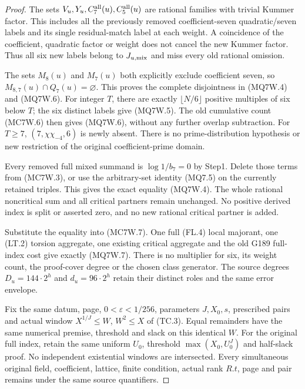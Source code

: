 \begin{proof}
The sets $V_u,Y_u,C_7^{\rm all}(u),C_5^{\rm all}(u)$ are
rational families with trivial Kummer factor. This includes
all the previously removed coefficient-seven quadratic/seven
labels and its single residual-match label at each weight.
A coincidence of the coefficient, quadratic factor or weight
does not cancel the new Kummer factor. Thus all six new labels
belong to $J_{u,\rm mix}$ and miss every old rational omission.

The sets $M_8(u)$ and $M_7(u)$ both explicitly exclude
coefficient seven, so $M_{8,7}(u)\cap Q_7(u)=\varnothing$.
This proves the complete disjointness in (MQ7W.4) and (MQ7W.6).
For integer $T$, there are exactly $\lfloor N/6\rfloor$
positive multiples of six below $T$; the six distinct labels
give (MQ7W.5). The old cumulative count (MC7W.6) then gives
(MQ7W.6), without any further overlap subtraction.
For $T\geq7$, $(7,\chi\chi_{-4},6)$ is newly absent.
There is no prime-distribution hypothesis or new restriction
of the original coefficient-prime domain.

Every removed full mixed summand is $\log1/b_7=0$ by Step1.
Delete those terms from (MC7W.3), or use the arbitrary-set
identity (MQ7.5) on the currently retained triples.
This gives the exact equality (MQ7W.4).
The whole rational noncritical sum and all critical partners
remain unchanged. No positive derived index is split or
asserted zero, and no new rational critical partner is added.

Substitute the equality into (MC7W.7). One full (FL.4)
local majorant, one (LT.2) torsion aggregate, one existing
critical aggregate and the old G189 full-index cost give
exactly (MQ7W.7). There is no multiplier for six, its weight
count, the proof-cover degree or the chosen class generator.
The source degrees $D_u=144\cdot2^h$ and $d_u=96\cdot2^h$
retain their distinct roles and the same error envelope.

Fix the same datum, page, $0<\varepsilon<1/256$,
parameters $J,X_0,s$, prescribed pairs and actual window
$X^{1/J}\leq W$, $W^2\leq X$ of (TC.3).
Equal remainders have the same numerical premise, threshold
and slack on this identical $W$. For the original full index,
retain the same uniform $U_0$, threshold $\max(X_0,U_0^J)$
and half-slack proof. No independent existential windows
are intersected. Every simultaneous original field, coefficient,
lattice, finite condition, actual rank $R.t$, page and pair
remains under the same source quantifiers.
\end{proof}


